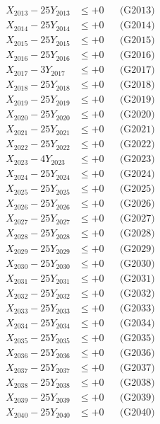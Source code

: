 \documentclass[a4paper,10pt]{article}
\begin{document}
{\begin{align}
X_{2013} - 25Y_{2013} &\leq +0 && \text{(G2013)} \\
X_{2014} - 25Y_{2014} &\leq +0 && \text{(G2014)} \\
X_{2015} - 25Y_{2015} &\leq +0 && \text{(G2015)} \\
X_{2016} - 25Y_{2016} &\leq +0 && \text{(G2016)} \\
X_{2017} - 3Y_{2017} &\leq +0 && \text{(G2017)} \\
X_{2018} - 25Y_{2018} &\leq +0 && \text{(G2018)} \\
X_{2019} - 25Y_{2019} &\leq +0 && \text{(G2019)} \\
X_{2020} - 25Y_{2020} &\leq +0 && \text{(G2020)} \\
\allowbreak
X_{2021} - 25Y_{2021} &\leq +0 && \text{(G2021)} \\
X_{2022} - 25Y_{2022} &\leq +0 && \text{(G2022)} \\
X_{2023} - 4Y_{2023} &\leq +0 && \text{(G2023)} \\
X_{2024} - 25Y_{2024} &\leq +0 && \text{(G2024)} \\
X_{2025} - 25Y_{2025} &\leq +0 && \text{(G2025)} \\
X_{2026} - 25Y_{2026} &\leq +0 && \text{(G2026)} \\
X_{2027} - 25Y_{2027} &\leq +0 && \text{(G2027)} \\
X_{2028} - 25Y_{2028} &\leq +0 && \text{(G2028)} \\
X_{2029} - 25Y_{2029} &\leq +0 && \text{(G2029)} \\
X_{2030} - 25Y_{2030} &\leq +0 && \text{(G2030)} \\
\allowbreak
X_{2031} - 25Y_{2031} &\leq +0 && \text{(G2031)} \\
X_{2032} - 25Y_{2032} &\leq +0 && \text{(G2032)} \\
X_{2033} - 25Y_{2033} &\leq +0 && \text{(G2033)} \\
X_{2034} - 25Y_{2034} &\leq +0 && \text{(G2034)} \\
X_{2035} - 25Y_{2035} &\leq +0 && \text{(G2035)} \\
X_{2036} - 25Y_{2036} &\leq +0 && \text{(G2036)} \\
X_{2037} - 25Y_{2037} &\leq +0 && \text{(G2037)} \\
X_{2038} - 25Y_{2038} &\leq +0 && \text{(G2038)} \\
X_{2039} - 25Y_{2039} &\leq +0 && \text{(G2039)} \\
X_{2040} - 25Y_{2040} &\leq +0 && \text{(G2040)} \\
\allowbreak

\end{align}}
\end{document}
